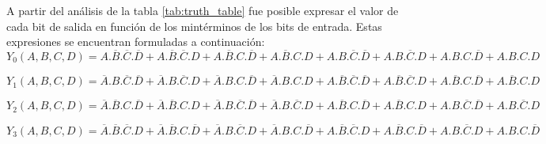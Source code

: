 \noindent
A partir del an\'alisis de la tabla \ref{tab:truth_table} fue posible expresar el valor de cada bit de salida en función de los mintérminos de los bits de entrada. Estas expresiones se encuentran formuladas a continuaci\'on:\\

\noindent
\small
$Y_0 (A,B,C,D) = A.\overline{B}.\overline{C}.\overline{D}
 +  A.\overline{B}.\overline{C}.D
 +  A.\overline{B}.C.\overline{D}
 +  A.\overline{B}.C.D
 +  A.B.\overline{C}.\overline{D}
 +  A.B.\overline{C}.D
 +  A.B.C.\overline{D}
 +  A.B.C.D $
\vspace{8mm}\par

\noindent
\small
$Y_1 (A,B,C,D) = \overline{A}.B.\overline{C}.\overline{D}
 + \overline{A}.B.\overline{C}.D
 + \overline{A}.B.C.\overline{D}
 + \overline{A}.B.C.D
 + A.\overline{B}.\overline{C}.\overline{D}
 + A.\overline{B}.\overline{C}.D
 + A.\overline{B}.C.\overline{D}
 + A.\overline{B}.C.D $
\vspace{8mm}\par

\noindent
\small
$Y_2 (A,B,C,D) = \overline{A}.\overline{B}.C.\overline{D}
 + \overline{A}.\overline{B}.C.D
 + \overline{A}.B.\overline{C}.\overline{D}
 + \overline{A}.B.\overline{C}.D
 + A.\overline{B}.C.\overline{D}
 + A.\overline{B}.C.D
 + A.B.\overline{C}.\overline{D}
 + A.B.\overline{C}.D $
\vspace{8mm}\par


\noindent
\small
$Y_3 (A,B,C,D) = \overline{A}.\overline{B}.\overline{C}.D
 + \overline{A}.\overline{B}.C.\overline{D}
 + \overline{A}.B.\overline{C}.D
 + \overline{A}.B.C.\overline{D}
 + A.\overline{B}.\overline{C}.D
 + A.\overline{B}.C.\overline{D}
 + A.B.\overline{C}.D
 + A.B.C.\overline{D} $
\vspace{8mm}\par

